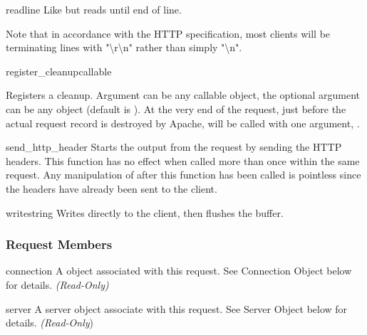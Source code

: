 \begin{methoddesc}[Request]{readline}{}
Like  but reads until end of line. 
                  
Note that in accordance with the HTTP specification, most clients will
be terminating lines with "\textbackslash r\textbackslash n" rather
than simply "\textbackslash n".

\end{methoddesc}

\begin{methoddesc}[Request]{register_cleanup}{callable}

Registers a cleanup. Argument  can be any callable
object, the optional argument  can be any object (default is
). At the very end of the request, just before the actual
request record is destroyed by Apache,  will be called
with one argument, .

\end{methoddesc}

\begin{methoddesc}[Request]{send_http_header}{}
Starts the output from the request by sending the HTTP headers. This
function has no effect when called more than once within the same
request. Any manipulation of  after this
function has been called is pointless since the headers have already
been sent to the client.
\end{methoddesc}

\begin{methoddesc}[Request]{write}{string}
Writes  directly to the client, then flushes the buffer. 
\end{methoddesc}

\subsubsection{Request Members\label{pyapi-mprequest-mem}}

\begin{memberdesc}[Request]{connection}
A  object associated with this request. See
Connection Object below for details.
\emph{(Read-Only)}
\end{memberdesc}

\begin{memberdesc}[Request]{server}
A server object associate with this request. See Server Object below
for details.
\emph{(Read-Only})
\end{memberdesc}

